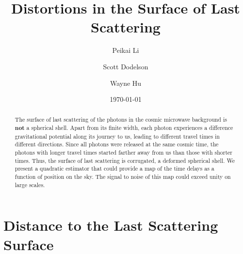 \documentclass[prl,amsmath,amssymb,floatfix,superscriptaddress,nofootinbib,twocolumn]{revtex4-1}
\begin{document}
\title{Distortions in the Surface of Last Scattering}


\author{\large Peikai Li}
\author{\large Scott Dodelson}
\author{\large Wayne Hu}

\date{\today}

\begin{abstract}
The surface of last scattering of the photons in the cosmic microwave background is {\bf not} a spherical shell. Apart from its finite width, each photon experiences a difference gravitational potential along its journey to us, leading to different travel times in different directions. Since all photons were released at the same cosmic time, the photons with longer travel times started farther away from us than those with shorter times. Thus, the surface of last scattering is corrugated, a deformed spherical shell. We present a quadratic estimator that could provide a map of the time delays as a function of position on the sky. The signal to noise of this map could exceed unity on large scales.
\end{abstract}

\maketitle

\section{Distance to the Last Scattering Surface}
\newcommand\fd{d}
\end{document}
